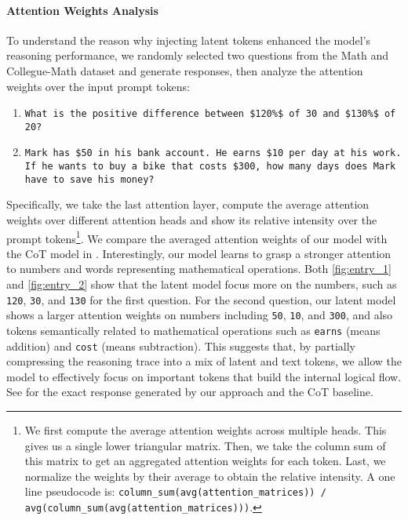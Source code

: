 \paragraph{Attention Weights Analysis}
To understand the reason why injecting latent tokens enhanced the model's reasoning performance, we randomly selected two questions from the Math and Collegue-Math dataset  and generate responses, then analyze the attention weights over the input prompt tokens:
\begin{enumerate}
    \item \texttt{What is the positive difference between \$120\%\$ of 30 and \$130\%\$ of 20?}
    \item \texttt{Mark has \$50 in his bank account. He earns \$10 per day at his work. If he wants to buy a bike that costs \$300, how many days does Mark have to save his money?}
\end{enumerate}
Specifically, we take the last attention layer, compute the average attention weights over different attention heads and show its relative intensity over the prompt tokens\footnote{We first compute the average attention weights across multiple heads. This gives us a single lower triangular matrix. Then,
we take the column sum of this matrix to get an aggregated attention weights for each token. Last, we normalize the weights by their average to obtain the relative intensity. A one line pseudocode is: \texttt{column\_sum(avg(attention\_matrices)) / avg(column\_sum(avg(attention\_matrices)))}. 
 }. We compare the averaged attention weights of our model with the CoT model in .
Interestingly, our model learns to grasp a stronger attention to numbers and words representing mathematical operations. Both \cref{fig:entry_1} and \cref{fig:entry_2} show that the latent model focus more on the numbers, such as \texttt{120}, \texttt{30}, and \texttt{130} for the first question.
For the second question, our latent model shows a larger attention weights on numbers including \texttt{50}, \texttt{10}, and \texttt{300}, and also tokens semantically related to mathematical operations such as \texttt{earns} (means addition) and \texttt{cost} (means subtraction). 
This suggests that, by partially compressing the reasoning trace into a mix of latent and text tokens, we allow the model to effectively focus on important tokens that build the internal logical flow. See  for the exact response generated by our approach and the CoT baseline.


